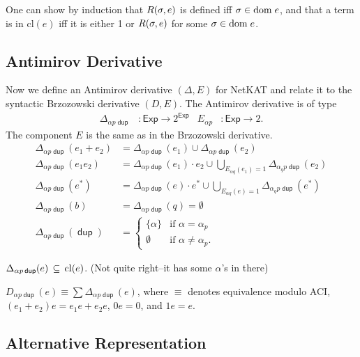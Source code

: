 \documentclass{article}
\newcommand\ssum{\mathop{\textstyle\sum}}
\newcommand\pdup{\mathop{\mathsf{dup}}}
\newcommand\Exp{\mathsf{Exp}}
\renewcommand\star{^{\textstyle *}}
\renewcommand\powerset[1]{2^{#1}}
\newcommand\clname{\mathrm{cl}}
\newcommand\cl[1]{\clname(#1)}
\begin{document}
One can show by induction that $R(\sigma,e)$ is defined iff $\sigma\in{\rm dom\;}e$, and that a term is in $\cl e$ iff it is either 1 or $R(\sigma,e)$ for some $\sigma\in{\rm dom\;}e$.

\subsection*{Antimirov Derivative}

Now we define an Antimirov derivative $(\Delta,E)$ for NetKAT and relate it to the syntactic Brzozowski derivative $(D,E)$. The Antimirov derivative is of type
\begin{align*}
\Delta_{\alpha p\pdup} &: \Exp\to\powerset\Exp & E_{\alpha p} &: \Exp\to 2.
\end{align*}
The component $E$ is the same as in the Brzozowski derivative.
\begin{align*}
\Delta_{\alpha p\pdup}(e_1+e_2) &= \Delta_{\alpha p\pdup}(e_1) \cup \Delta_{\alpha p\pdup}(e_2)\\
\Delta_{\alpha p\pdup}(e_1e_2) &= \Delta_{\alpha p\pdup}(e_1)\cdot e_2 \cup \bigcup_{E_{\alpha q}(e_1)=1}\Delta_{\alpha_q p\pdup}(e_2)\\
\Delta_{\alpha p\pdup}(e\star) &= \Delta_{\alpha p\pdup}(e)\cdot e\star \cup \bigcup_{E_{\alpha q}(e)=1}\Delta_{\alpha_q p\pdup}(e\star)\\
\Delta_{\alpha p\pdup}(b) &= \Delta_{\alpha p\pdup}(q) = \emptyset\\
\Delta_{\alpha p\pdup}(\pdup) &= \begin{cases}
\{\alpha\} & \text{if $\alpha=\alpha_p$}\\
\emptyset & \text{if $\alpha\neq\alpha_p$.}
\end{cases}
\end{align*}

\begin{lemma}
\label{eq:Deltacl}
$\Delta_{\alpha p\pdup}(e) \subs \cl e$. (Not quite right--it has some $\alpha$'s in there)
\end{lemma}

\begin{lemma}
\label{eq:DDelta}
$D_{\alpha p\pdup}(e) \equiv \ssum\Delta_{\alpha p\pdup}(e)$,
where $\equiv$ denotes equivalence modulo ACI, $(e_1+e_2)e = e_1e + e_2e$, $0e = 0$, and $1e = e$.
\end{lemma}

\subsection*{Alternative Representation}
\end{document}
